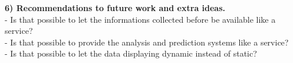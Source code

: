 \textbf{6) Recommendations to future work and extra ideas.}\\
- Is that possible to let the informations collected before be available like a service?\\
		- Is that possible to provide the analysis and prediction systems like a service?\\
		- Is that possible to let the data displaying dynamic instead of static?\\






